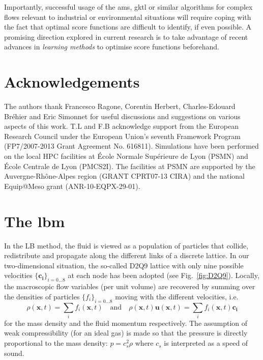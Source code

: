 \documentclass{jfm}
\begin{document}
Importantly, successful usage of the \ac{ams}, \ac{gktl} or similar algorithms for complex flows relevant to industrial or environmental situations will require coping with the fact that optimal score functions
are difficult to identify, if even possible.
A promising direction explored in current research is to take advantage of recent advances in \emph{learning methods} to optimise score functions beforehand.

\section{Acknowledgements}
The authors thank Francesco Ragone, Corentin Herbert, Charles-Edouard Bréhier and Eric Simonnet for useful discussions and suggestions on various aspects of this work.
T.L and F.B acknowledge support from the European Research Council under the European Union's seventh Framework Program (FP7/2007-2013 Grant Agreement No. 616811).
Simulations have been performed on the local HPC facilities at École Normale Supérieure de Lyon (PSMN) and École Centrale de Lyon (PMCS2I).
The facilities at PSMN are supported by the Auvergne-Rhône-Alpes region (GRANT CPRT07-13 CIRA) and the national Equip@Meso grant (ANR-10-EQPX-29-01).

\appendix*
\section{The \acl{lbm}}
\label{sec:lbm}

In the LB method, the fluid is viewed as a population of particles that collide, redistribute and propagate along the different links of a discrete lattice. 
In our two-dimensional situation, the so-called D2Q9 lattice with only nine possible velocities $\{\mathbf{c_i}\}_{i=0...8}$ at each node has been adopted (see  Fig.~\ref{fig:D2Q9}).
Locally, the macroscopic flow variables (per unit volume) are recovered by summing over the densities of particles $\{f_i\}_{i=0...8}$ moving with the different velocities, i.e.
\[
\rho(\mathbf{x},t) = \sum_i f_i(\mathbf{x},t) \quad \mathrm{and}\quad \rho(\mathbf{x},t) \mathbf u(\mathbf{x},t) = \sum_i f_i(\mathbf{x},t) \mathbf{c_i}
\]
for the mass density and the fluid momentum respectively. The assumption of weak compressibility (for an ideal gas) is made so that the pressure is directly proportional to the mass density: $p = c_s^2 \rho$ where $c_s$ is interpreted as a speed of sound.  
\end{document}
